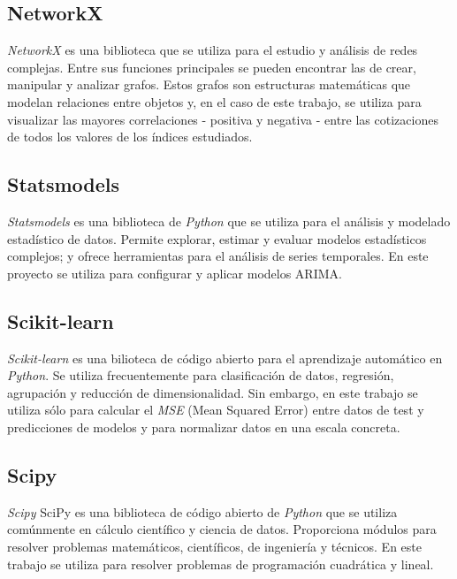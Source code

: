 \subsection{NetworkX}\label{networkx}

\emph{NetworkX} \citep{online:networkx} es una biblioteca que se utiliza para el estudio y análisis de redes complejas. Entre sus funciones principales se pueden encontrar las de crear, manipular y analizar grafos. Estos grafos son estructuras matemáticas que modelan relaciones entre objetos y, en el caso de  este trabajo, se utiliza para visualizar las mayores correlaciones - positiva y negativa - entre las cotizaciones de todos los valores de los índices estudiados. 

\subsection{Statsmodels}\label{statsmodels}

\emph{Statsmodels} \citep{online:statsmodels} es una biblioteca de \emph{Python} que se utiliza para el análisis y modelado estadístico de datos. Permite explorar, estimar y evaluar modelos estadísticos complejos; y ofrece herramientas para el análisis de series temporales. En este proyecto se utiliza para configurar y aplicar modelos ARIMA. 

\subsection{Scikit-learn}\label{scikit-learn}

\emph{Scikit-learn} \citep{online:scikit_learn} es una bilioteca de código abierto para el aprendizaje automático en \emph{Python}. Se utiliza frecuentemente para clasificación de datos, regresión, agrupación y reducción de dimensionalidad. Sin embargo, en este trabajo se utiliza sólo para calcular el \emph{MSE} (Mean Squared Error) entre datos de test y predicciones de modelos y para normalizar datos en una escala concreta.  


\subsection{Scipy}\label{scipy}

\emph{Scipy} \citep{2020SciPy-NMeth} SciPy es una biblioteca de código abierto de \emph{Python} que se utiliza comúnmente en cálculo científico y ciencia de datos. Proporciona módulos para resolver problemas matemáticos, científicos, de ingeniería y técnicos. En este trabajo se utiliza para resolver problemas de programación cuadrática y lineal. 

